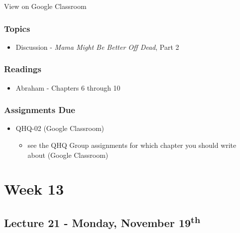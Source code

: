 \documentclass[]{book}
\providecommand{\tightlist}{%
  \setlength{\itemsep}{0pt}\setlength{\parskip}{0pt}}
\theoremstyle{definition}
\theoremstyle{definition}
\theoremstyle{definition}
\theoremstyle{remark}
\begin{document}
View on Google Classroom

\hypertarget{topics-23}{%
\subsubsection*{Topics}\label{topics-23}}

\begin{itemize}
\tightlist
\item
  Discussion - \emph{Mama Might Be Better Off Dead}, Part 2
\end{itemize}

\hypertarget{readings-21}{%
\subsubsection*{Readings}\label{readings-21}}

\begin{itemize}
\tightlist
\item
  Abraham - Chapters 6 through 10
\end{itemize}

\hypertarget{assignments-due-5}{%
\subsubsection*{Assignments Due}\label{assignments-due-5}}

\begin{itemize}
\tightlist
\item
  QHQ-02 (Google Classroom)

  \begin{itemize}
  \tightlist
  \item
    see the QHQ Group assignments for which chapter you should write
    about (Google Classroom)
  \end{itemize}
\end{itemize}

\hypertarget{week-13}{%
\section*{Week 13}\label{week-13}}

\hypertarget{lecture-21---monday-november-19th}{%
\subsection*{\texorpdfstring{Lecture 21 - Monday, November
19\textsuperscript{th}}{Lecture 21 - Monday, November 19th}}\label{lecture-21---monday-november-19th}}
\end{document}
